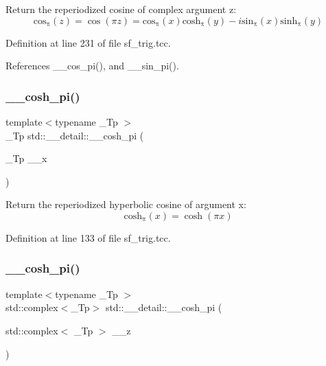 Return the reperiodized cosine of complex argument z\+: \[ \mathrm{cos_\pi}(z) = \cos(\pi z) = \mathrm{cos_\pi}(x) \mathrm{cosh_\pi}(y) - i \mathrm{sin_\pi}(x) \mathrm{sinh_\pi}(y) \] 

Definition at line 231 of file sf\+\_\+trig.\+tcc.



References \+\_\+\+\_\+cos\+\_\+pi(), and \+\_\+\+\_\+sin\+\_\+pi().

\mbox{\label{namespacestd_1_1____detail_ae6e440447e88191b3cd19daaf7fda96e}} 
\subsubsection{\texorpdfstring{\+\_\+\+\_\+cosh\+\_\+pi()}{\_\_cosh\_pi()}\hspace{0.1cm}{\footnotesize\ttfamily [1/2]}}
{\footnotesize\ttfamily template$<$typename \+\_\+\+Tp $>$ \\
\+\_\+\+Tp std\+::\+\_\+\+\_\+detail\+::\+\_\+\+\_\+cosh\+\_\+pi (\begin{DoxyParamCaption}\item[{\+\_\+\+Tp}]{\+\_\+\+\_\+x }\end{DoxyParamCaption})}

Return the reperiodized hyperbolic cosine of argument x\+: \[ \mathrm{cosh_\pi}(x) = \cosh(\pi x) \] 

Definition at line 133 of file sf\+\_\+trig.\+tcc.

\mbox{\label{namespacestd_1_1____detail_a257e13bd4fa9711a87ea68a783ee40d9}} 
\subsubsection{\texorpdfstring{\+\_\+\+\_\+cosh\+\_\+pi()}{\_\_cosh\_pi()}\hspace{0.1cm}{\footnotesize\ttfamily [2/2]}}
{\footnotesize\ttfamily template$<$typename \+\_\+\+Tp $>$ \\
std\+::complex$<$\+\_\+\+Tp$>$ std\+::\+\_\+\+\_\+detail\+::\+\_\+\+\_\+cosh\+\_\+pi (\begin{DoxyParamCaption}\item[{std\+::complex$<$ \+\_\+\+Tp $>$}]{\+\_\+\+\_\+z }\end{DoxyParamCaption})}

